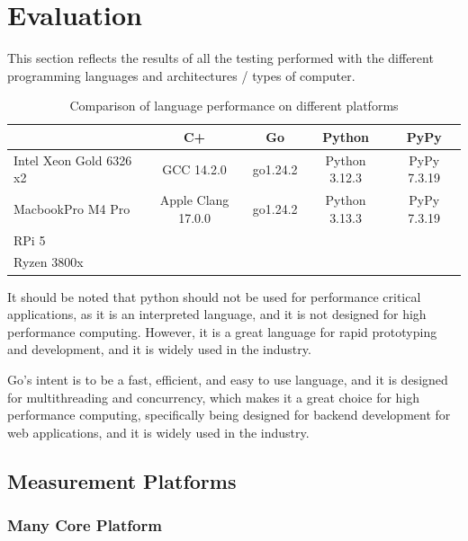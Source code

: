 \chapter{Evaluation}\label{chap:evaluation}

This section reflects the results of all the testing performed with the different programming languages and architectures / types of computer.

\begin{table}[ht]
  \centering
  \begin{tabular}{lcccc}
    \toprule
                            & C\++                  & Go        & Python        & PyPy \\
    \midrule
    Intel Xeon Gold 6326 x2 &  GCC 14.2.0           & go1.24.2  & Python 3.12.3 & PyPy 7.3.19 \\
    MacbookPro M4 Pro       &  Apple Clang 17.0.0   & go1.24.2  & Python 3.13.3 & PyPy 7.3.19 \\
    RPi 5                   &                       &           &               &             \\
    Ryzen 3800x             &                       &           &               &             \\
    \bottomrule
  \end{tabular}
  \caption{Comparison of language performance on different platforms}
  \label{tab:lang-platforms}
\end{table}

It should be noted that python should not be used for performance critical applications, as it is an interpreted language, and it is not designed for high performance computing. However, it is a great language for rapid prototyping and development, and it is widely used in the industry. 

Go's intent is to be a fast, efficient, and easy to use language, and it is designed for multithreading and concurrency, which makes it a great choice for high performance computing, specifically being designed for backend development for web applications, and it is widely used in the industry.

\section{Measurement Platforms}
\subsection{Many Core Platform}

